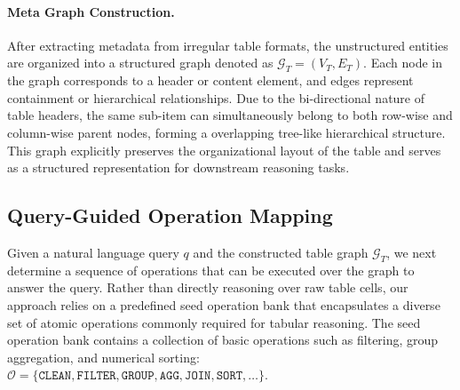\paragraph{Meta Graph Construction.}
After extracting metadata from irregular table formats, the unstructured entities are organized into a structured graph denoted as $\mathcal{G}_T = (V_T, E_T)$. Each node in the graph corresponds to a header or content element, and edges represent containment or hierarchical relationships. Due to the bi-directional nature of table headers, the same sub-item can simultaneously belong to both row-wise and column-wise parent nodes, forming a overlapping tree-like hierarchical structure. This graph explicitly preserves the organizational layout of the table and serves as a structured representation for downstream reasoning tasks.
\vspace{-7mm}

\subsection{Query-Guided Operation Mapping}
\vspace{-2mm}
Given a natural language query $q$ and the constructed table graph $\mathcal{G}_T$, we next determine a sequence of operations that can be executed over the graph to answer the query. Rather than directly reasoning over raw table cells, our approach relies on a predefined seed operation bank that encapsulates a diverse set of atomic operations commonly required for tabular reasoning. The seed operation bank contains a collection of basic operations such as filtering, group aggregation, and numerical sorting: $ \mathcal{O} = \{\texttt{CLEAN}, \texttt{FILTER}, \texttt{GROUP}, \texttt{AGG}, \texttt{JOIN}, \texttt{SORT}, \dots\}.
$


